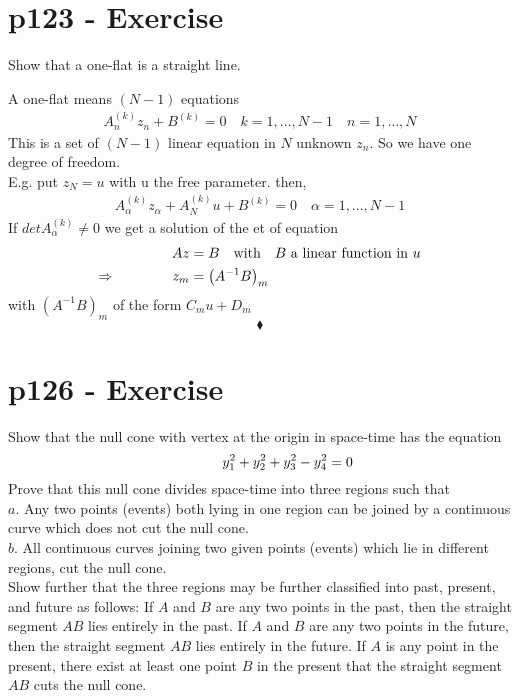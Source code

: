 \section{p123 - Exercise}
\begin{tcolorbox}
Show that a one-flat is a straight line.
\end{tcolorbox}
A one-flat means $(N-1)$ equations 
\begin{align}
A^{(k)}_nz_n + B^{(k)} =0 \quad k=1,\dots,N-1\quad n= 1,\dots,N
\end{align}
This is a set of $(N-1)$ linear equation in $N$ unknown $z_n$. So we have one degree of freedom.\\
E.g. put $z_N=u$ with u the free parameter. then,
\begin{align}
A^{(k)}_{\alpha}z_{\alpha}+ A^{(k)}_{N}u+ B^{(k)} =0 \quad \alpha=1,\dots,N-1
\end{align}
If $detA^{(k)}_{\alpha} \neq0$ we get a solution of the et of equation
\begin{align}
Az&=B \quad\text{with}\quad B \text{ a linear function in } u\\
\Rightarrow\quad\quad\quad\quad z_m&= \left(A^{-1}B\right)_m
\end{align}
with $\left(A^{-1}B\right)_m$ of the form $C_mu+D_m$
$$\blacklozenge$$
\newpage

\section{p126 - Exercise}
\begin{tcolorbox}
Show that the null cone with vertex at the origin in space-time has the equation $$\mathbf{\quad\quad\quad\quad} y^2_1+y^2_2+y^2_3-y^2_4=0$$
Prove that this null cone divides space-time into three regions such that \\
$\mathit{a.}$ Any two points (events) both lying in one region can be joined by a continuous curve which does not cut the null cone.\\
$\mathit{b.}$ All continuous curves joining two given points (events) which lie in different regions, cut the null cone.\\
Show further that the three regions may be further classified into past, present, and future as follows: If $A$ and $B$ are any two points in the past, then the straight segment $AB$ lies entirely in the past. If $A$ and $B$ are any two points in the future, then the straight segment $AB$ lies entirely in the future. If $A$ is any point in the present, there exist at least one point $B$ in the present that the straight segment $AB$ cuts the null cone.
\end{tcolorbox}


